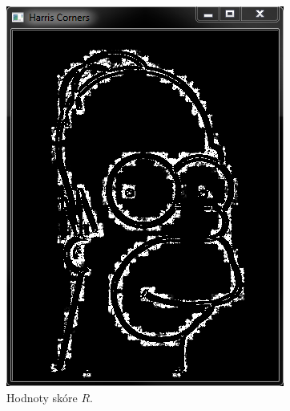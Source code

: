 \documentclass[12pt, a4paper]{article}
\begin{document}
{\begin{figure}[!ht]
\begin{minipage}[t]{0.49\textwidth}
		\includegraphics[width = \textwidth]{HarrisCorners.png}
		\caption{Hodnoty skóre $R$.}
		\label{fig:HarrisCorners}
	\end{minipage}%
\end{figure}
\begin{figure}[!ht]
	\centering
	\begin{minipage}[t]{0.49\textwidth}

\end{minipage}
\end{figure}}
\end{document}
